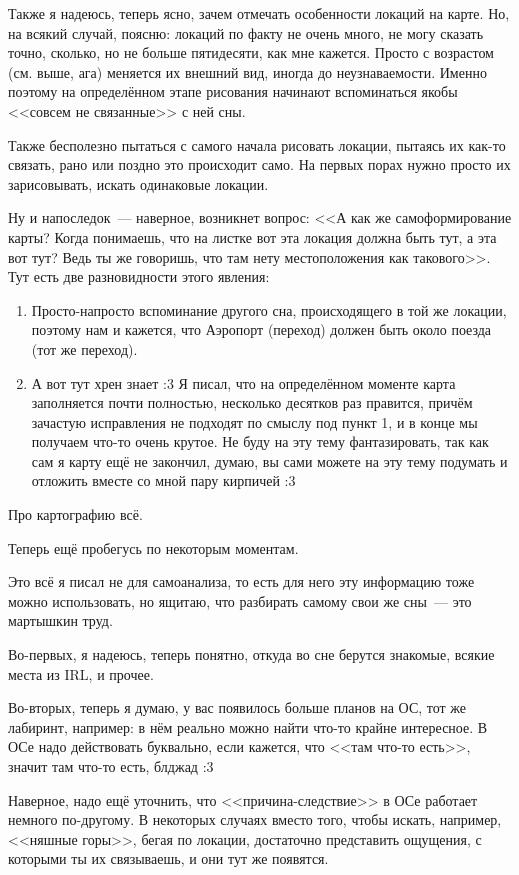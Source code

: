 \documentclass[a5paper,12pt,twoside]{memoir}
\begin{document}
Также я надеюсь, теперь ясно, зачем отмечать особенности локаций на карте. Но, на всякий случай, поясню: локаций по факту не очень много, не могу сказать точно, сколько, но не больше пятидесяти, как мне кажется. Просто с возрастом (см. выше, ага) меняется их внешний вид, иногда до неузнаваемости. Именно поэтому на определённом этапе рисования начинают вспоминаться якобы <<совсем не связанные>> с ней сны.
 
Также бесполезно пытаться с самого начала рисовать локации, пытаясь их как-то связать, рано или поздно это происходит само. На первых порах нужно просто их зарисовывать, искать одинаковые локации.
 
Ну и напоследок~--- наверное, возникнет вопрос: <<А как же самоформирование карты? Когда понимаешь, что на листке вот эта локация должна быть тут, а эта вот тут? Ведь ты же говоришь, что там нету местоположения как такового>>. 
Тут есть две разновидности этого явления:
\begin{enumerate}
\item Просто-напросто вспоминание другого сна, происходящего в той же локации, поэтому нам и кажется, что Аэропорт (переход) должен быть около поезда (тот же переход). 
\item А вот тут хрен знает :3 Я писал, что на определённом моменте карта заполняется почти полностью, несколько десятков раз правится, причём зачастую исправления не подходят по смыслу под пункт 1, и в конце мы получаем что-то очень крутое. Не буду на эту тему фантазировать, так как сам я карту ещё не закончил, думаю, вы сами можете на эту тему подумать и отложить вместе со мной пару кирпичей :3 
\end{enumerate}

Про картографию всё.

Теперь ещё пробегусь по некоторым моментам.
 
Это всё я писал не для самоанализа, то есть для него эту информацию тоже можно использовать, но ящитаю, что разбирать самому свои же сны~--- это мартышкин труд. 

Во-первых, я надеюсь, теперь понятно, откуда во сне берутся знакомые, всякие места из IRL, и прочее.

Во-вторых, теперь я думаю, у вас появилось больше планов на ОС, тот же лабиринт, например: в нём реально можно найти что-то крайне интересное. В ОСе надо действовать буквально, если кажется, что <<там что-то есть>>, значит там что-то есть, блджад :3 

Наверное, надо ещё уточнить, что <<при\-чи\-на-след\-стви\-е>> в ОСе работает немного по-другому. В некоторых случаях вместо того, чтобы искать, например, <<няшные горы>>, бегая по локации, достаточно представить ощущения, с которыми ты их связываешь, и они тут же появятся.
 
\end{document}
